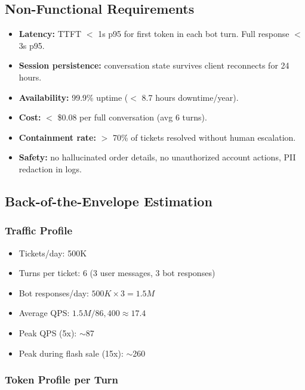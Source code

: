 \subsection*{Non-Functional Requirements}

\begin{itemize}
  \item \textbf{Latency:} TTFT $<$ 1s p95 for first token in each bot turn. Full response $<$ 3s p95.
  \item \textbf{Session persistence:} conversation state survives client reconnects for 24 hours.
  \item \textbf{Availability:} 99.9\% uptime ($<$ 8.7 hours downtime/year).
  \item \textbf{Cost:} $<$ \$0.08 per full conversation (avg 6 turns).
  \item \textbf{Containment rate:} $>$ 70\% of tickets resolved without human escalation.
  \item \textbf{Safety:} no hallucinated order details, no unauthorized account actions, PII redaction in logs.
\end{itemize}

\subsection*{Back-of-the-Envelope Estimation}

\subsubsection*{Traffic Profile}

\begin{itemize}
  \item Tickets/day: 500K
  \item Turns per ticket: 6 (3 user messages, 3 bot responses)
  \item Bot responses/day: $500K \times 3 = 1.5M$
  \item Average QPS: $1.5M / 86{,}400 \approx 17.4$
  \item Peak QPS (5x): $\sim$87
  \item Peak during flash sale (15x): $\sim$260
\end{itemize}

\subsubsection*{Token Profile per Turn}

